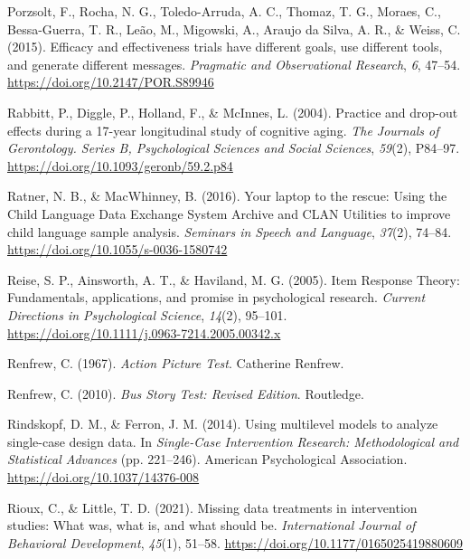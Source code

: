 \documentclass{krantz}
\newlength{\cslhangindent}
\newlength{\cslentryspacingunit} %
\newenvironment{CSLReferences}[2] %
{%
\setlength{\parindent}{0pt}
\ifodd #1
\let\oldpar\par
\def\par{\hangindent=\cslhangindent\oldpar}
\fi
\setlength{\parskip}{#2\cslentryspacingunit}
}%
{}
\begin{document}
\begin{CSLReferences}{1}{0}
\leavevmode{}%
Porzsolt, F., Rocha, N. G., Toledo-Arruda, A. C., Thomaz, T. G., Moraes, C., Bessa-Guerra, T. R., Leão, M., Migowski, A., Araujo da Silva, A. R., \& Weiss, C. (2015). Efficacy and effectiveness trials have different goals, use different tools, and generate different messages. \emph{Pragmatic and Observational Research}, \emph{6}, 47--54. \url{https://doi.org/10.2147/POR.S89946}

\leavevmode{}%
Rabbitt, P., Diggle, P., Holland, F., \& McInnes, L. (2004). Practice and drop-out effects during a 17-year longitudinal study of cognitive aging. \emph{The Journals of Gerontology. Series B, Psychological Sciences and Social Sciences}, \emph{59}(2), P84--97. \url{https://doi.org/10.1093/geronb/59.2.p84}

\leavevmode{}%
Ratner, N. B., \& MacWhinney, B. (2016). Your laptop to the rescue: {Using} the {Child Language Data Exchange System Archive} and {CLAN Utilities} to improve child language sample analysis. \emph{Seminars in Speech and Language}, \emph{37}(2), 74--84. \url{https://doi.org/10.1055/s-0036-1580742}

\leavevmode{}%
Reise, S. P., Ainsworth, A. T., \& Haviland, M. G. (2005). Item {Response Theory}: {Fundamentals}, applications, and promise in psychological research. \emph{Current Directions in Psychological Science}, \emph{14}(2), 95--101. \url{https://doi.org/10.1111/j.0963-7214.2005.00342.x}

\leavevmode{}%
Renfrew, C. (1967). \emph{Action {Picture Test}}. {Catherine Renfrew}.

\leavevmode{}%
Renfrew, C. (2010). \emph{Bus {Story Test}: {Revised Edition}}. {Routledge}.

\leavevmode{}%
Rindskopf, D. M., \& Ferron, J. M. (2014). Using multilevel models to analyze single-case design data. In \emph{Single-{Case Intervention Research}: {Methodological} and {Statistical Advances}} (pp. 221--246). {American Psychological Association}. \url{https://doi.org/10.1037/14376-008}

\leavevmode{}%
Rioux, C., \& Little, T. D. (2021). Missing data treatments in intervention studies: {What} was, what is, and what should be. \emph{International Journal of Behavioral Development}, \emph{45}(1), 51--58. \url{https://doi.org/10.1177/0165025419880609}


\end{CSLReferences}
\end{document}
